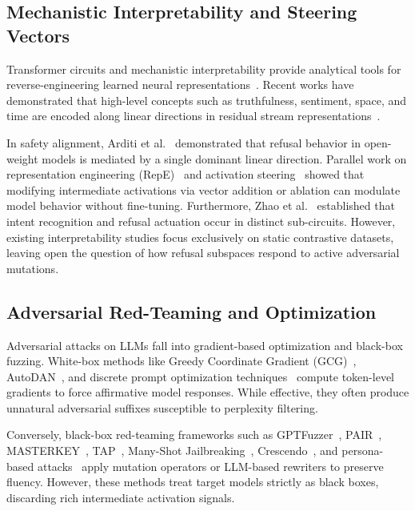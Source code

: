 \documentclass[manuscript,screen,review,anonymous]{acmart}
\begin{document}
\subsection{Mechanistic Interpretability and Steering Vectors}
Transformer circuits and mechanistic interpretability provide analytical tools for reverse-engineering learned neural representations~\cite{elhage2021mathematical,olsson2022context,nanda2023emergent,wang2022interpretability}. Recent works have demonstrated that high-level concepts such as truthfulness, sentiment, space, and time are encoded along linear directions in residual stream representations~\cite{marks2023geometry,park2024linear,gurnee2023language,nostalgebraist2020interpreting,cunningham2023sparse,bricken2023monosemanticity,templeton2024scaling}. 

In safety alignment, Arditi et al.~\cite{arditi2024refusal} demonstrated that refusal behavior in open-weight models is mediated by a single dominant linear direction. Parallel work on representation engineering (RepE)~\cite{zou2023representation} and activation steering~\cite{turner2023activation,rimsky2023steering,li2024inference,todd2023function,hernandez2023linearity,casper2023benchmarking} showed that modifying intermediate activations via vector addition or ablation can modulate model behavior without fine-tuning. Furthermore, Zhao et al.~\cite{zhao2024representation} established that intent recognition and refusal actuation occur in distinct sub-circuits. However, existing interpretability studies focus exclusively on static contrastive datasets, leaving open the question of how refusal subspaces respond to active adversarial mutations.

\subsection{Adversarial Red-Teaming and Optimization}
Adversarial attacks on LLMs fall into gradient-based optimization and black-box fuzzing. White-box methods like Greedy Coordinate Gradient (GCG)~\cite{zou2023universal}, AutoDAN~\cite{liu2023autodan}, and discrete prompt optimization techniques~\cite{schwinn2024adversarial,sitawarin2024adversarial} compute token-level gradients to force affirmative model responses. While effective, they often produce unnatural adversarial suffixes susceptible to perplexity filtering. 

Conversely, black-box red-teaming frameworks such as GPTFuzzer~\cite{yu2023gptfuzzer}, PAIR~\cite{chao2023jailbreaking}, MASTERKEY~\cite{deng2023jailbreaker}, TAP~\cite{mehrotra2023tree}, Many-Shot Jailbreaking~\cite{anil2024many}, Crescendo~\cite{russinovich2024great}, and persona-based attacks~\cite{perez2022red,shen2023do,casper2023red} apply mutation operators or LLM-based rewriters to preserve fluency. However, these methods treat target models strictly as black boxes, discarding rich intermediate activation signals.
\end{document}
